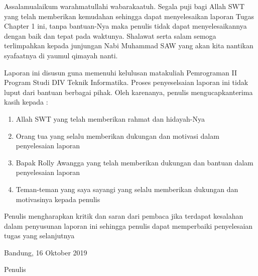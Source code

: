 \begin{acknowledgements}
Assalamualaikum warahmatullahi wabarakaatuh. Segala puji bagi Allah SWT yang telah memberikan kemudahan sehingga dapat menyelesaikan laporan Tugas Chapter 1 ini, tanpa bantuan-Nya maka penulis tidak dapat menyelesaikannya dengan baik dan tepat pada waktunya. Shalawat serta salam semoga terlimpahkan kepada junjungan Nabi Muhammad SAW yang akan kita nantikan syafaatnya di yaumul qimayah nanti.

Laporan ini disusun guna memenuhi kelulusan matakuliah Pemrograman II Program Studi DIV Teknik Informatika. Proses penyeselsaian laporan ini tidak luput dari bantuan berbagai pihak. Oleh karenanya, penulis mengucapkanterima kasih kepada :
\begin{enumerate}

\item Allah SWT yang telah memberikan rahmat dan hidayah-Nya
\item Orang tua yang selalu memberikan dukungan dan motivasi dalam penyelesaian laporan
\item Bapak Rolly Awangga yang telah memberikan dukungan dan bantuan dalam penyelesaian laporan
\item Teman-teman yang saya sayangi yang selalu memberikan dukungan dan motivasinya kepada penulis

\end{enumerate}

Penulis mengharapkan kritik dan saran dari pembaca jika terdapat kesalahan dalam penyusunan laporan ini sehingga penulis dapat memperbaiki penyelesaian tugas yang selanjutnya

\begin{raggedleft}

Bandung, 16 Oktober 2019

Penulis

\end{raggedleft}
\end{acknowledgements}